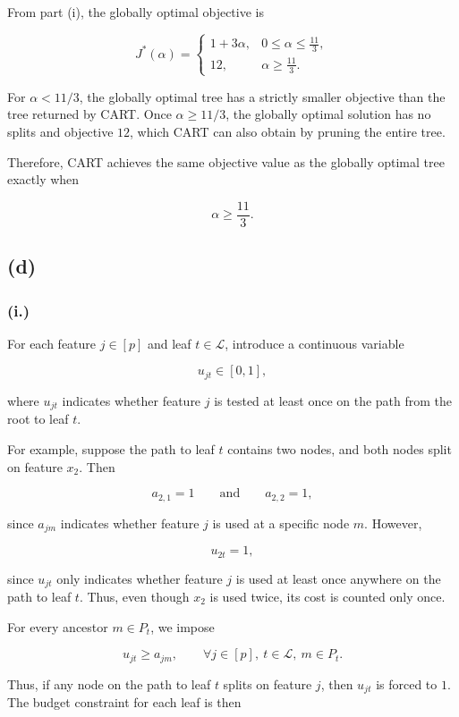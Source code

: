 \documentclass{article}
\begin{document}
From part (i), the globally optimal objective is

$$
J^*(\alpha)
=
\begin{cases}
1+3\alpha, & 0\leq\alpha\leq\frac{11}{3},\\
12, & \alpha\geq\frac{11}{3}.
\end{cases}
$$

For $\alpha<11/3$, the globally optimal tree has a strictly smaller objective than the tree returned by CART. Once $\alpha\geq11/3$, the globally optimal solution has no splits and objective $12$, which CART can also obtain by pruning the entire tree.

Therefore, CART achieves the same objective value as the globally optimal tree exactly when

$$
\boxed{\alpha\geq\frac{11}{3}}.
$$




\subsection*{(d)}

\subsubsection*{(i.)}

For each feature $j\in[p]$ and leaf $t\in\mathcal{L}$, introduce a continuous variable

$$
u_{jt}\in[0,1],
$$

where $u_{jt}$ indicates whether feature $j$ is tested at least once on the path from the root to leaf $t$.

For example, suppose the path to leaf $t$ contains two nodes, and both nodes split on feature $x_2$. Then

$$
a_{2,1}=1
\qquad\text{and}\qquad
a_{2,2}=1,
$$

since $a_{jm}$ indicates whether feature $j$ is used at a specific node $m$. However,

$$
u_{2t}=1,
$$

since $u_{jt}$ only indicates whether feature $j$ is used at least once anywhere on the path to leaf $t$. Thus, even though $x_2$ is used twice, its cost is counted only once.

For every ancestor $m\in P_t$, we impose

$$
u_{jt}\geq a_{jm},
\qquad
\forall j\in[p],\ t\in\mathcal{L},\ m\in P_t.
$$

Thus, if any node on the path to leaf $t$ splits on feature $j$, then $u_{jt}$ is forced to $1$. The budget constraint for each leaf is then
\end{document}
